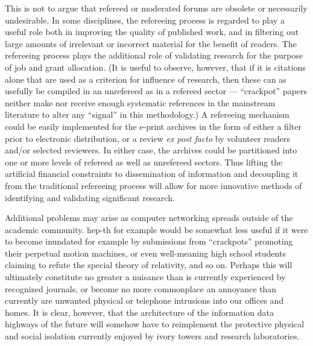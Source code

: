 This is not to argue that refereed or moderated forums are obsolete or
necessarily undesirable. In some disciplines, the refereeing process is
regarded to play a useful role both in improving the quality of published work,
and in filtering out large amounts of irrelevant or incorrect material for the
benefit of readers. The refereeing process plays the additional role of
validating research for the purpose of job and grant allocation. (It is useful
to observe, however, that if it is citations alone that are used as a criterion
for influence of research, then these can as usefully be compiled in an
unrefereed as in a refereed sector --- ``crackpot'' papers neither make nor
receive enough systematic references in the mainstream literature to alter any
``signal'' in this methodology.)  A refereeing mechanism could
be easily implemented for the e-print archives
in the form of either a filter prior to electronic distribution, or a
review {\it ex post facto\/} by volunteer readers and/or selected reviewers.
In either case, the archives could be partitioned into one or more
levels of refereed as well as unrefereed sectors. Thus lifting the artificial
financial constraints to dissemination of information and decoupling it from
the traditional refereeing process will allow for more
innovative methods of identifying and validating significant research.

Additional problems may arise as computer networking spreads outside of the
academic community. hep-th for example would be somewhat less useful if it were
to become inundated for example by submissions from ``crackpots'' promoting
their perpetual motion machines, or even well-meaning high school students
claiming to refute the special theory of relativity, and so on. Perhaps this
will ultimately constitute no greater a nuisance than is currently experienced
by recognized journals, or become no more commonplace an annoyance than
currently are unwanted physical or telephone intrusions into our offices and
homes. It is clear, however, that the architecture of the information data
highways of the future will somehow have to reimplement the protective physical
and social isolation currently enjoyed by ivory towers and research
laboratories.

